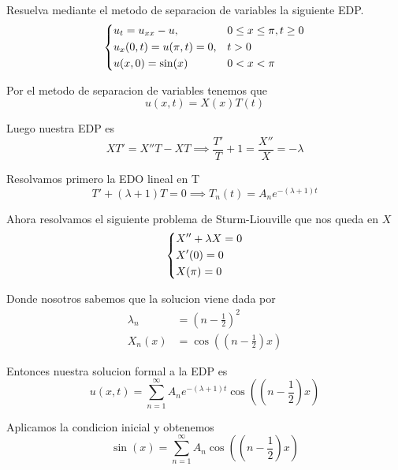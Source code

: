 \documentclass[../main.tex]{subfiles}
\begin{document}
\begin{problem}
  Resuelva mediante el metodo de separacion de variables la siguiente EDP.
  \begin{equation*}
  \begin{dcases}
    u_t = u_{xx} - u, & 0 \leq x \leq \pi, t \geq 0\\
    u_x(0, t) = u(\pi, t) = 0, & t > 0\\
    u(x, 0) = \sin(x) & 0 < x < \pi
  \end{dcases}
  \end{equation*}
\end{problem}
\begin{solution}
  Por el metodo de separacion de variables tenemos que
  \begin{equation*}
    u(x, t) = X(x)T(t)
  \end{equation*}

  Luego nuestra EDP es
  \begin{equation*}
    XT' = X''T - XT \implies \frac{T'}{T} + 1 = \frac{X''}{X} = -\lambda
  \end{equation*}

  Resolvamos primero la EDO lineal en T
  \begin{equation*}
    T' + (\lambda + 1)T = 0 \implies T_{n}(t) = A_{n}e^{-(\lambda + 1) t}
  \end{equation*}

  Ahora resolvamos el siguiente problema de Sturm-Liouville que nos queda en $X$
  \begin{equation*}
    \begin{dcases}
      X'' + \lambda X = 0\\
      X'(0) = 0\\
      X(\pi) = 0
    \end{dcases}
  \end{equation*}

  Donde nosotros sabemos que la solucion viene dada por
  \begin{align*}
    \lambda_{n} &= (n - \frac12)^{2}\\
    X_{n}(x) &= \cos((n - \frac12)x)
  \end{align*}

  Entonces nuestra solucion formal a la EDP es
  \begin{equation*}
    u(x, t) = \sum_{n = 1}^{\infty} A_{n}e^{-(\lambda + 1)t}\cos((n - \frac12)x)
  \end{equation*}

  Aplicamos la condicion inicial y obtenemos
  \begin{equation*}
    \sin(x) = \sum_{n = 1}^{\infty} A_{n}\cos((n - \frac{1}{2})x)
  \end{equation*}


\end{solution}
\end{document}
